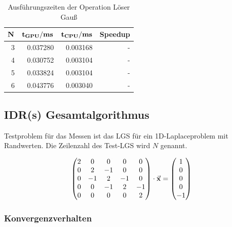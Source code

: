 \documentclass[journal]{IEEEtran}
\begin{document}
\begin{table}[h]
\renewcommand{\arraystretch}{1.3}
\caption{Ausführungszeiten der Operation Löser Gauß}
\label{valuessolver}
\centering
\begin{tabular}{|r||r|r|r|}
\hline
\bfseries $ \bf N$ & \bfseries{ $ \bf t_{GPU} / ms $ } &  $ \bf t_{CPU} / ms$ & \bfseries{Speedup} \\

\hline
\hline

3   &  0.037280 & 0.003168 & - \\
4   &  0.030752 & 0.003104 & - \\
5   &  0.033824 & 0.003104 & - \\
6   &  0.043776 & 0.003040 & - \\

\hline



\hline
\end{tabular}
\end{table}


\subsection{IDR(s) Gesamtalgorithmus}

Testproblem für das Messen ist das LGS für ein 1D-Laplaceproblem mit Randwerten.
Die Zeilenzahl des Test-LGS wird $N$ genannt.

\begin{displaymath}
  \begin{pmatrix}
      2 &  0  &  0  & 0   & 0 \\
      0 &  2  & -1  & 0   & 0 \\
      0 & -1  &  2  & -1  & 0 \\
      0 &  0  &  -1  &  2 & -1 \\
      0 &  0  &  0   &  0 & 2  \\
  \end{pmatrix}
   \cdot \vec{ \bf{x} }
   =
  \begin{pmatrix} 1 \\ 0  \\ 0 \\ 0  \\ -1
  \end{pmatrix}
\end{displaymath}

\subsubsection{Konvergenzverhalten}
\end{document}
